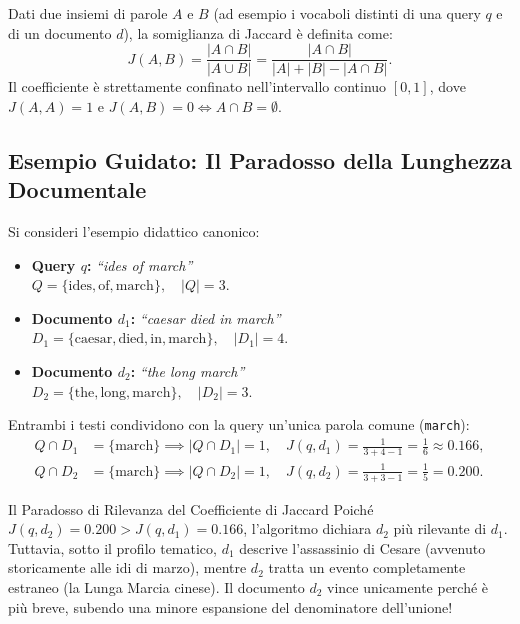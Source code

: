 \begin{definition}
Dati due insiemi di parole $A$ e $B$ (ad esempio i vocaboli distinti di una query $q$ e di un documento $d$), la somiglianza di Jaccard \`e definita come:
\begin{equation}
J(A, B) = \frac{|A \cap B|}{|A \cup B|} = \frac{|A \cap B|}{|A| + |B| - |A \cap B|}.
\end{equation}
Il coefficiente \`e strettamente confinato nell'intervallo continuo $[0, 1]$, dove $J(A, A) = 1$ e $J(A, B) = 0 \iff A \cap B = \emptyset$.
\end{definition}

\FloatBarrier
\subsection{Esempio Guidato: Il Paradosso della Lunghezza Documentale}
\label{subsec:esempio-jaccard-paradosso}

Si consideri l'esempio didattico canonico:
\begin{itemize}
    \item \textbf{Query $q$:} \textit{``ides of march''}\\
    $Q = \{\text{ides}, \text{of}, \text{march}\}, \quad |Q| = 3$.
    \item \textbf{Documento $d_1$:} \textit{``caesar died in march''}\\
    $D_1 = \{\text{caesar}, \text{died}, \text{in}, \text{march}\}, \quad |D_1| = 4$.
    \item \textbf{Documento $d_2$:} \textit{``the long march''}\\
    $D_2 = \{\text{the}, \text{long}, \text{march}\}, \quad |D_2| = 3$.
\end{itemize}

Entrambi i testi condividono con la query un'unica parola comune (\texttt{march}):
\begin{align}
Q \cap D_1 &= \{\text{march}\} \implies |Q \cap D_1| = 1, \quad J(q, d_1) = \frac{1}{3 + 4 - 1} = \frac{1}{6} \approx \mathbf{0.166}, \\
Q \cap D_2 &= \{\text{march}\} \implies |Q \cap D_2| = 1, \quad J(q, d_2) = \frac{1}{3 + 3 - 1} = \frac{1}{5} = \mathbf{0.200}.
\end{align}

\begin{alertblock}{Il Paradosso di Rilevanza del Coefficiente di Jaccard}
Poiché $J(q, d_2) = 0.200 > J(q, d_1) = 0.166$, l'algoritmo dichiara $d_2$ pi\`u rilevante di $d_1$. Tuttavia, sotto il profilo tematico, $d_1$ descrive l'assassinio di Cesare (avvenuto storicamente alle idi di marzo), mentre $d_2$ tratta un evento completamente estraneo (la Lunga Marcia cinese). Il documento $d_2$ vince unicamente perch\'e \`e pi\`u breve, subendo una minore espansione del denominatore dell'unione!
\end{alertblock}


